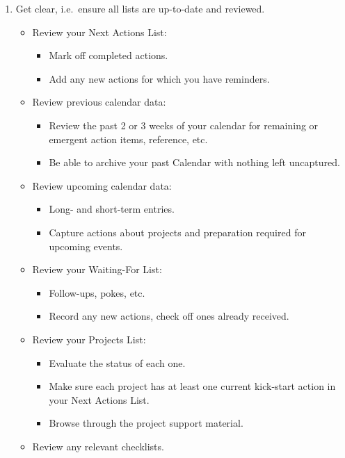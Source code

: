 \documentclass{article}
\begin{document}
\begin{itemize}
\begin{itemize}
\begin{enumerate}
        \item Get clear, i.e.\ ensure all lists are up-to-date and reviewed.
        \begin{itemize}
          \item Review your Next Actions List:
          \begin{itemize}
            \item Mark off completed actions.
            \item Add any new actions for which you have reminders.
          \end{itemize}
          \item Review previous calendar data:
          \begin{itemize}
            \item Review the past 2 or 3 weeks of your calendar for remaining or emergent action items, reference, etc.
            \item Be able to archive your past Calendar with nothing left uncaptured.
          \end{itemize}
          \item Review upcoming calendar data:
          \begin{itemize}
            \item Long- and short-term entries.
            \item Capture actions about projects and preparation required for upcoming events.
          \end{itemize}
          \item Review your Waiting-For List:
          \begin{itemize}
            \item Follow-ups, pokes, etc.
            \item Record any new actions, check off ones already received.
          \end{itemize}
          \item Review your Projects List:
          \begin{itemize}
            \item Evaluate the status of each one.
            \item Make sure each project has at least one current kick-start action in your Next Actions List.
            \item Browse through the project support material.
          \end{itemize}
          \item Review any relevant checklists.

\end{itemize}
\end{enumerate}
\end{itemize}
\end{itemize}
\end{document}
